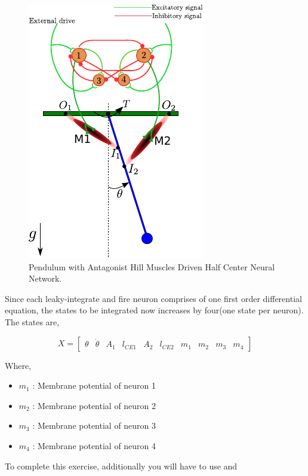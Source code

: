 \documentclass{cmc}
\begin{document}
\begin{figure}[H]
  \centering
  \includegraphics[scale=1.5]{figures/pendulum_muscles_neurons.pdf}
  \caption{Pendulum with Antagonist Hill Muscles Driven Half Center
    Neural Network.}
  \label{fig:p_muscles_neurons}
\end{figure}

Since each leaky-integrate and fire neuron comprises of one first
order differential equation, the states to be integrated now increases
by four(one state per neuron). The states are,


\begin{equation}
  \label{eq:1}
  X = \begin{bmatrix}
    \theta & \dot{\theta} & A_1 & l_{CE1} & A_2 & l_{CE2} & m_1 & m_2 & m_3 & m_4
  \end{bmatrix}
\end{equation}

Where,

\begin{itemize}
\item $m_1$ : Membrane potential of neuron 1
\item $m_2$ : Membrane potential of neuron 2
\item $m_3$ : Membrane potential of neuron 3
\item $m_4$ : Membrane potential of neuron 4
\end{itemize}

To complete this exercise, additionally you will have to use
 and 
\end{document}
